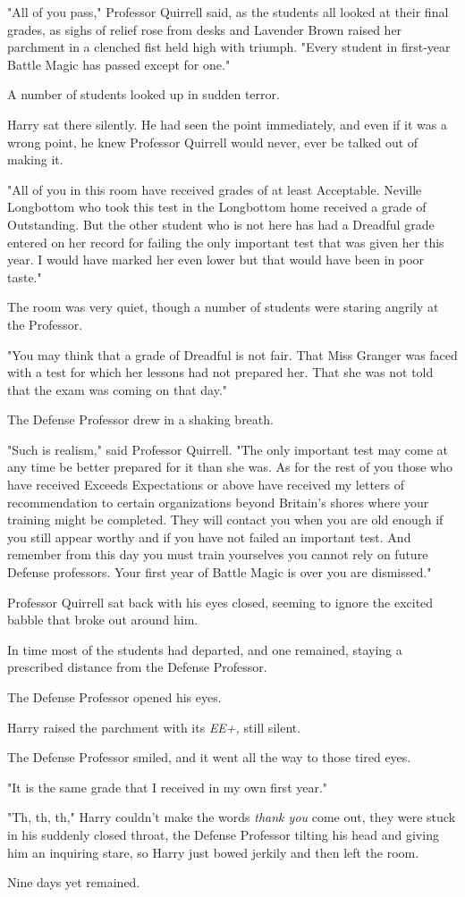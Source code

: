 "All of you{\el} pass," Professor Quirrell said, as the students all looked
at their final grades, as sighs of relief rose from desks and Lavender Brown
raised her parchment in a clenched fist held high with triumph. "Every student
in first-year Battle Magic has passed{\el} except for one."

A number of students looked up in sudden terror.

Harry sat there silently. He had seen the point immediately, and even if it was
a wrong point, he knew Professor Quirrell would never, ever be talked out of
making it.

"All of you in this room{\el} have received grades of at least Acceptable.
Neville Longbottom{\el} who took this test in the Longbottom home{\el}
received a grade of Outstanding. But the other student who is not here{\el}
has had a Dreadful grade entered on her record{\el} for failing the only
important test{\el} that was given her this year. I would have marked her
even lower{\el} but that would have been in poor taste."

The room was very quiet, though a number of students were staring angrily at
the Professor.

"You may think that a grade of Dreadful{\el} is not fair. That Miss Granger
was faced with a test{\el} for which her lessons{\el} had not prepared
her. That she was not told{\el} that the exam was coming on that day."

The Defense Professor drew in a shaking breath.

"Such is realism," said Professor Quirrell. "The only important test{\el}
may come at any time{\el} be better prepared for it{\el} than she was. As
for the rest of you{\el} those who have received Exceeds Expectations or
above{\el} have received my letters of recommendation{\el} to certain
organizations beyond Britain's shores{\el} where your training might be
completed. They will contact you{\el} when you are old enough{\el} if you
still appear worthy{\el} and if you have not failed an important test. And
remember{\el} from this day{\el} you must train yourselves{\el} you
cannot rely{\el} on future Defense professors. Your first year of Battle
Magic is over{\el} you are dismissed."

Professor Quirrell sat back with his eyes closed, seeming to ignore the excited
babble that broke out around him.

In time most of the students had departed, and one remained, staying a
prescribed distance from the Defense Professor.

The Defense Professor opened his eyes.

Harry raised the parchment with its \emph{EE+,} still silent.

The Defense Professor smiled, and it went all the way to those tired eyes.

"It is the same grade{\el} that I received in my own first year."

"Th, th, th," Harry couldn't make the words \emph{thank you} come out, they
were stuck in his suddenly closed throat, the Defense Professor tilting his
head and giving him an inquiring stare, so Harry just bowed jerkily and then
left the room.

Nine days yet remained.
